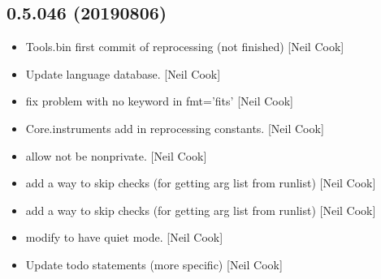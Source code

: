 \documentclass[a4paper,10pt,english]{report}
\begin{document}
\subsection{0.5.046 (2019\sphinxhyphen{}08\sphinxhyphen{}06)}
\label{\detokenize{misc/changelog:id116}}\begin{itemize}
\item {} 
Tools.bin \sphinxhyphen{} first commit of reprocessing (not finished) {[}Neil Cook{]}

\item {} 
Update language database. {[}Neil Cook{]}

\item {} 
 \sphinxhyphen{} fix problem with no  keyword in fmt=’fits’
{[}Neil Cook{]}

\item {} 
Core.instruments \sphinxhyphen{} add in reprocessing constants. {[}Neil Cook{]}

\item {} 
 \sphinxhyphen{} allow  not be non\sphinxhyphen{}private. {[}Neil
Cook{]}

\item {} 
 \sphinxhyphen{} add a way to skip checks (for getting arg
list from runlist) {[}Neil Cook{]}

\item {} 
 \sphinxhyphen{} add a way to skip checks (for getting arg
list from runlist) {[}Neil Cook{]}

\item {} 
 \sphinxhyphen{} modify  to have
quiet mode. {[}Neil Cook{]}

\item {} 
Update todo statements (more specific) {[}Neil Cook{]}

\end{itemize}
\end{document}
